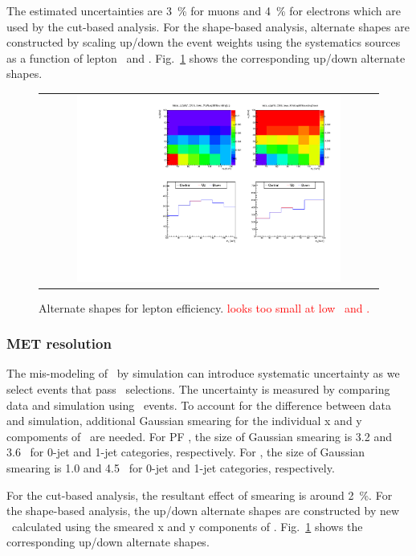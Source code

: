 The estimated uncertainties are 3~\% for muons and 4~\% for electrons 
which are used by the cut-based analysis. 
For the shape-based analysis, alternate shapes are constructed by
scaling up/down the event weights using the systematics sources
as a function of lepton \pt\ and \Eta.
Fig.~\ref{fig:alter_lepeff} shows the corresponding up/down alternate shapes. 

%
\begin{figure}[htp]
\centering
\begin{tabular}{c}
\includegraphics[width=0.8\textwidth]{figures/histo_qqWW_CMS_hww_MVALepEffBounding_0j_zoom.pdf}
\end{tabular}
\caption{Alternate shapes for lepton efficiency. \textcolor{red}{looks too small at low \mT\ and \mll.}}
\label{fig:alter_lepeff}
\end{figure}


\subsubsection{MET resolution} 

The mis-modeling of \met\ by simulation can introduce systematic uncertainty 
as we select events that pass \met\ selections. The uncertainty is measured 
by comparing data and simulation using \dyll\ events. To account for the 
difference between data and simulation, additional Gaussian smearing for 
the individual x and y compoments of \met\ are needed. 
For PF \met, the size of Gaussian smearing is 3.2 and 3.6~\GeV %
for 0-jet and 1-jet categories, respectively.  
For \trkmet, the size of Gaussian smearing is 1.0 and 4.5~\GeV %
for 0-jet and 1-jet categories, respectively.  

For the cut-based analysis, the resultant effect of smearing is around 2~\%. 
For the shape-based analysis, the up/down alternate shapes are constructed 
by new \mT\ calculated using the smeared x and y components of \met.
Fig.~\ref{fig:alter_lepeff} shows the corresponding up/down alternate shapes. 

